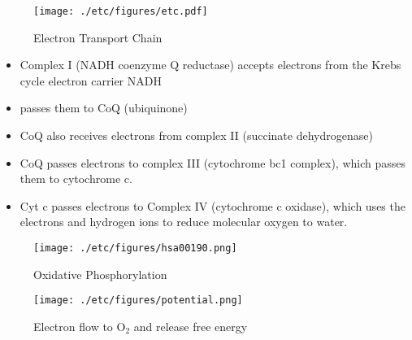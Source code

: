 \documentclass{scrartcl}
\begin{document}
\begin{enumerate}
\begin{figure}[htbp]
\centering
\texttt{[image: ./etc/figures/etc.pdf]}
\caption{\label{fig:org3011c26}
Electron Transport Chain}
\end{figure}

\begin{itemize}
\item Complex I (NADH coenzyme Q reductase) accepts electrons from the
Krebs cycle electron carrier NADH
\item passes them to CoQ (ubiquinone)
\item CoQ also receives electrons from complex II (succinate dehydrogenase)
\item CoQ passes electrons to complex III (cytochrome bc1 complex), which
passes them to cytochrome c.
\item Cyt c passes electrons to Complex IV (cytochrome c oxidase), which
uses the electrons and hydrogen ions to reduce molecular oxygen to
water.
\end{itemize}

\begin{figure}[htbp]
\centering
\texttt{[image: ./etc/figures/hsa00190.png]}
\caption[ETC]{\label{fig:org8ccee2c}
Oxidative Phosphorylation}
\end{figure}

\begin{figure}[htbp]
\centering
\texttt{[image: ./etc/figures/potential.png]}
\caption[redox]{\label{fig:orgf1b00ca}
Electron flow to O\(_{\text{2}}\) and release free energy}
\end{figure}
\end{enumerate}
\end{document}
